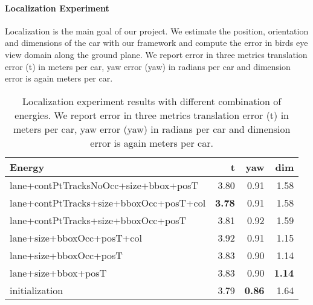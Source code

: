 \paragraph{Localization Experiment}
Localization is the main goal of our project. We estimate the position, orientation and dimensions of the car with our framework and compute the error in birds eye view domain along the ground plane. We report error in three metrics translation error (t) in meters per car, yaw error (yaw) in radians per car and dimension error is again meters per car.



\begin{table}
  \centering
  \begin{tabular}{lrrr}
    \toprule
    Energy & t & yaw & dim \\
    \midrule
    lane+contPtTracksNoOcc+size+bbox+posT   & 3.80 & 0.91 & 1.58 \\
    lane+contPtTracks+size+bboxOcc+posT+col & \textbf{3.78} & 0.91 & 1.58 \\
    lane+contPtTracks+size+bboxOcc+posT     & 3.81 & 0.92 & 1.59 \\
    lane+size+bboxOcc+posT+col              & 3.92 & 0.91 & 1.15 \\
    lane+size+bboxOcc+posT                  & 3.83 & 0.90 & 1.14 \\
    lane+size+bbox+posT                     & 3.83 & 0.90 & \textbf{1.14} \\
    initialization                          & 3.79 & \textbf{0.86} & 1.64 \\
    \bottomrule
  \end{tabular}
  \caption{Localization experiment results with different combination of energies. We report error in three metrics translation error (t) in meters per car, yaw error (yaw) in radians per car and dimension error is again meters per car.}
\end{table}

